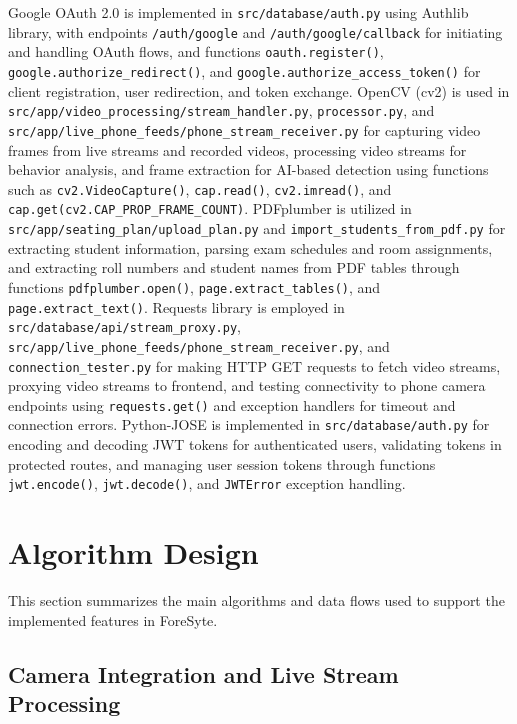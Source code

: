 Google OAuth 2.0 is implemented in \texttt{src/database/auth.py} using Authlib library, with endpoints \texttt{/auth/google} and \texttt{/auth/google/callback} for initiating and handling OAuth flows, and functions \texttt{oauth.register()}, \texttt{google.authorize\_redirect()}, and \texttt{google.authorize\_access\_token()} for client registration, user redirection, and token exchange. OpenCV (cv2) is used in \texttt{src/app/video\_processing/stream\_handler.py}, \texttt{processor.py}, and \texttt{src/app/live\_phone\_feeds/phone\_stream\_receiver.py} for capturing video frames from live streams and recorded videos, processing video streams for behavior analysis, and frame extraction for AI-based detection using functions such as \texttt{cv2.VideoCapture()}, \texttt{cap.read()}, \texttt{cv2.imread()}, and \texttt{cap.get(cv2.CAP\_PROP\_FRAME\_COUNT)}. PDFplumber is utilized in \texttt{src/app/seating\_plan/upload\_plan.py} and \texttt{import\_students\_from\_pdf.py} for extracting student information, parsing exam schedules and room assignments, and extracting roll numbers and student names from PDF tables through functions \texttt{pdfplumber.open()}, \texttt{page.extract\_tables()}, and \texttt{page.extract\_text()}. Requests library is employed in \texttt{src/database/api/stream\_proxy.py}, \texttt{src/app/live\_phone\_feeds/phone\_stream\_receiver.py}, and \texttt{connection\_tester.py} for making HTTP GET requests to fetch video streams, proxying video streams to frontend, and testing connectivity to phone camera endpoints using \texttt{requests.get()} and exception handlers for timeout and connection errors. Python-JOSE is implemented in \texttt{src/database/auth.py} for encoding and decoding JWT tokens for authenticated users, validating tokens in protected routes, and managing user session tokens through functions \texttt{jwt.encode()}, \texttt{jwt.decode()}, and \texttt{JWTError} exception handling.

\section{Algorithm Design}

This section summarizes the main algorithms and data flows used to support the implemented features in ForeSyte.

\subsection{Camera Integration and Live Stream Processing}

